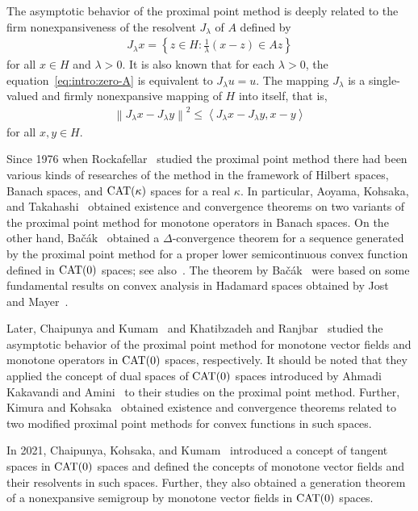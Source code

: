 \documentclass[draft]{amsart}
\numberwithin{equation}{section}
\providecommand{\norm}[1]{\left\lVert#1\right\rVert}
\newcommand{\ip}[2]{\left\langle #1, #2 \right\rangle}
\newcommand{\CAT}{\textup{CAT}}
\theoremstyle{plain}
\theoremstyle{definition}
\theoremstyle{remark}
\begin{document}
The asymptotic behavior of the proximal point method 
is deeply related to the firm nonexpansiveness 
of the resolvent $J_{\lambda}$ of $A$ defined by 
\begin{align*}
J_{\lambda}x = \left\{z\in H: \frac{1}{\lambda}(x-z)\in Az\right\} 
\end{align*}
for all $x\in H$ and $\lambda>0$. 
It is also known that for each $\lambda>0$, 
the equation~\eqref{eq:intro:zero-A} 
is equivalent to $J_{\lambda}u=u$. 
The mapping $J_{\lambda}$ is a single-valued and 
firmly nonexpansive mapping of $H$ into itself, that is, 
\begin{align*}
 \norm{J_{\lambda}x-J_{\lambda}y}^2 
 \leq \ip{J_{\lambda}x-J_{\lambda}y}{x-y}
\end{align*}
for all $x, y\in H$. 

Since 1976 when Rockafellar~\cite{MR0410483} studied 
the proximal point method 
there had been various kinds of researches of the method 
in the framework of Hilbert spaces, Banach spaces, and $\CAT(\kappa)$ spaces 
for a real $\kappa$. In particular, Aoyama, Kohsaka, and Takahashi~\cite{MR2780284} 
obtained existence and convergence theorems on two variants of the proximal point 
method for monotone operators in Banach spaces. On the other hand, 
Ba{\v{c}}{\'a}k~\cite{MR3047087} 
obtained a $\Delta$-convergence theorem for a sequence generated by 
the proximal point method for a proper lower semicontinuous convex 
function defined in $\CAT(0)$ spaces; see also~\cite{MR3241330}. 
The theorem by Ba{\v{c}}{\'a}k~\cite{MR3047087} were based on 
some fundamental results on convex analysis in Hadamard spaces 
obtained by Jost~\cite{MR1360608} and Mayer~\cite{MR1651416}. 

Later, Chaipunya and Kumam~\cite{MR3691338} 
and Khatibzadeh and Ranjbar~\cite{MR3679017} studied 
the asymptotic behavior of the proximal point method 
for monotone vector fields and monotone operators 
in $\CAT(0)$ spaces, respectively. 
It should be noted that they applied the concept of 
dual spaces of $\CAT(0)$ spaces introduced by 
Ahmadi Kakavandi and Amini~\cite{MR2680038} 
to their studies on the proximal point method.  
Further, Kimura and Kohsaka~\cite{MR3574140} obtained 
existence and convergence theorems related to 
two modified proximal point methods for convex functions 
in such spaces. 

In 2021, Chaipunya, Kohsaka, and Kumam~\cite{MR4292325} 
introduced a concept of tangent spaces in $\CAT(0)$ spaces 
and defined the concepts of monotone vector fields and their resolvents  
in such spaces. Further, they also obtained a generation 
theorem of a nonexpansive semigroup by monotone vector fields 
in $\CAT(0)$ spaces. 
\end{document}

